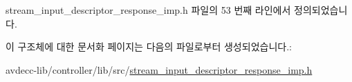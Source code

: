 stream\+\_\+input\+\_\+descriptor\+\_\+response\+\_\+imp.\+h 파일의 53 번째 라인에서 정의되었습니다.



이 구조체에 대한 문서화 페이지는 다음의 파일로부터 생성되었습니다.\+:\begin{DoxyCompactItemize}
\item 
avdecc-\/lib/controller/lib/src/\hyperlink{stream__input__descriptor__response__imp_8h}{stream\+\_\+input\+\_\+descriptor\+\_\+response\+\_\+imp.\+h}\end{DoxyCompactItemize}
